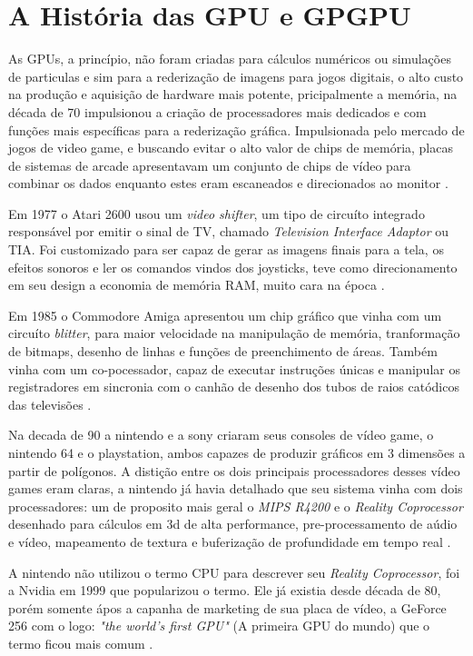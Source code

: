 \section{A História das GPU e GPGPU}
  As GPUs, a princípio, não foram criadas para cálculos numéricos ou simulações de particulas e sim para a rederização de imagens para jogos digitais, o alto custo na produção e aquisição de hardware mais potente, pricipalmente a memória, na década de 70 impulsionou a criação de processadores mais dedicados e com funções mais específicas para a rederização gráfica. Impulsionada pelo mercado de jogos de video game, e buscando evitar o alto valor de chips de memória, placas de sistemas de arcade apresentavam um conjunto de chips de vídeo para combinar os dados enquanto estes eram escaneados e direcionados ao monitor \citep{Hague:13}.

  Em 1977 o Atari 2600 usou um \textit{video shifter}, um tipo de circuíto integrado responsável por emitir o sinal de TV, chamado \textit{Television Interface Adaptor} ou TIA. Foi customizado para ser capaz de gerar as imagens finais para a tela, os efeitos sonoros e ler os comandos vindos dos joysticks, teve como direcionamento em seu design a economia de memória RAM, muito cara na época \citep{Hague:13} \citep{atari-field:83}.

  Em 1985 o Commodore Amiga apresentou um chip gráfico que vinha com um circuíto \textit{blitter}, para maior velocidade na manipulação de memória, tranformação de bitmaps, desenho de linhas e funções de preenchimento de áreas. Também vinha com um co-pocessador, capaz de executar instruções únicas e manipular os registradores em sincronia com o canhão de desenho dos tubos de raios catódicos das televisões \citep{amiga:17}.

  Na decada de 90 a nintendo e a sony criaram seus consoles de vídeo game, o nintendo 64 e o playstation, ambos capazes de produzir gráficos em 3 dimensões a partir de polígonos. A distição entre os dois principais processadores desses vídeo games eram claras, a nintendo já havia detalhado que seu sistema vinha com dois processadores: um de proposito mais geral o \textit{MIPS R4200} e o \textit{Reality Coprocessor} desenhado para cálculos em 3d de alta performance, pre-processamento de aúdio e vídeo, mapeamento de textura e buferização de profundidade em tempo real \citep{manual64:98} \citep{N64Launch:96}.

  A nintendo não utilizou o termo CPU para descrever seu \textit{Reality Coprocessor}, foi a Nvidia em 1999 que popularizou o termo. Ele já existia desde década de 80, porém somente ápos a capanha de marketing de sua placa de vídeo, a GeForce 256 com o logo: \textit{"the world's first GPU"} (A primeira GPU do mundo) que o termo ficou mais comum \citep{nvida256}.

